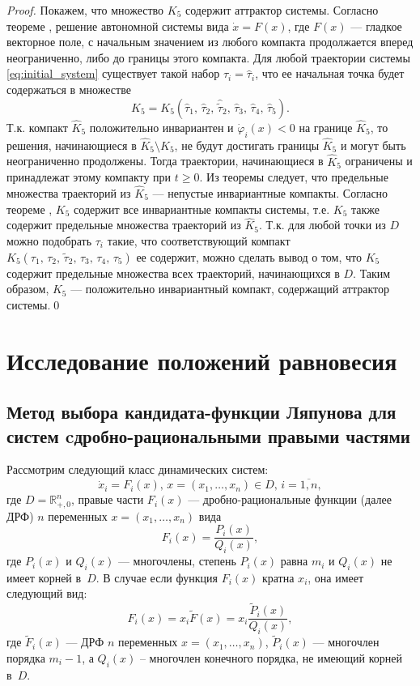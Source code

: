 \documentclass[14pt,a4paper]{extarticle}
\begin{document}
\begin{proof}
		Покажем, что множество $K_5$ содержит аттрактор системы. Согласно теореме , решение автономной системы вида $\dot{x}=F(x)$, где $F(x)$ --- гладкое векторное поле, с начальным значением из любого компакта продолжается вперед неограниченно, либо до границы этого компакта. Для любой траектории системы \ref{eq:initial_system} существует такой набор $\tau_i = \hat{\tau}_i$, что ее начальная точка будет содержаться в множестве 
		\[\hat{K}_5 = K_5(\hat\tau_1,\,\hat\tau_2,\,\hat{\tilde{\tau}}_2,\,\hat\tau_3,\,\hat\tau_4,\,\hat\tau_5).\]
		Т.к. компакт $\hat{K}_5$ положительно инвариантен и $\dot{\varphi}_i(x)<0$ на границе $\hat{K}_5$, то решения, начинающиеся в $\hat{K}_5\setminus K_5$, не будут достигать границы $\hat{K}_5$ и могут быть неограниченно продолжены. Тогда траектории, начинающиеся в $\hat{K}_5$ ограничены и принадлежат этому компакту при $t\ge0$. Из теоремы  следует, что предельные множества траекторий из $\hat{K}_5$ --- непустые инвариантные компакты. Согласно теореме , $K_5$ содержит все инвариантные компакты системы, т.е. $K_5$ также содержит предельные множества траекторий из $\hat{K}_5$. Т.к. для любой точки из $D$ можно подобрать $\tau_i$ такие, что соответствующий компакт $K_5(\tau_1,\,\tau_2,\,\tilde{\tau}_2,\,\tau_3,\,\tau_4,\,\tau_5)$ ее содержит, можно сделать вывод о том, что $K_5$ содержит предельные множества всех траекторий, начинающихся в $D$. Таким образом, $K_5$ --- положительно инвариантный компакт, содержащий аттрактор системы.\qed
		
	\end{proof}	
	
	\section{Исследование положений равновесия}
	\subsection{Метод выбора кандидата-функции Ляпунова для систем c\linebreak дробно-рациональными правыми частями}
	
	Рассмотрим следующий класс динамических систем:
	\[\dot{x}_i=F_i(x),\, x=(x_1,\ldots,x_n)\in D,\, i=\overline{1,n},\]
	где $D = \mathbb{R}^{n}_{+,0}$, правые части $F_i(x)$ --- дробно-рациональные функции (далее ДРФ) $n$ переменных $x=(x_1,\ldots,x_n)$ вида 
	\[F_i(x)=\dfrac{P_i(x)}{Q_i(x)},\]
	где $P_i(x)$ и $Q_i(x)$ --- многочлены, степень $P_i(x)$ равна $m_i$ и $Q_i(x)$ не имеет корней в~$D$. В случае если функция $F_i(x)$ кратна $x_i$, она имеет следующий вид:
	\[F_i(x)=x_i\tilde{F}(x) = x_i\dfrac{\tilde{P}_i(x)}{Q_i(x)},\]
	где $\tilde{F}_i(x)$ --- ДРФ $n$ переменных $x=(x_1,\ldots,x_n)$, $\tilde{P}_i(x)$ --- многочлен порядка $m_i-1$, а $Q_i(x)$ -- многочлен конечного порядка, не имеющий корней в~$D$.
	
\end{document}
